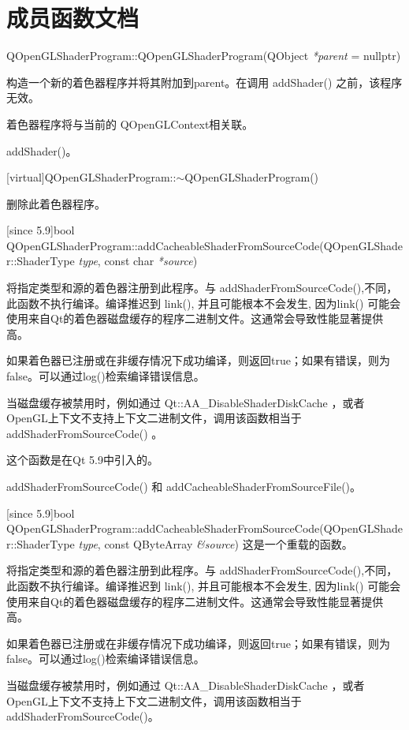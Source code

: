 \section{成员函数文档}

QOpenGLShaderProgram::QOpenGLShaderProgram(QObject \emph{*parent} = nullptr)

构造一个新的着色器程序并将其附加到parent。在调用 addShader() 之前，该程序无效。

着色器程序将与当前的 QOpenGLContext相关联。

\begin{seeAlso}
addShader()。
\end{seeAlso}

[virtual]QOpenGLShaderProgram::$\sim$QOpenGLShaderProgram()

删除此着色器程序。

[since 5.9]bool QOpenGLShaderProgram::addCacheableShaderFromSourceCode(QOpenGLShader::ShaderType \emph{type}, const char \emph{*source})

将指定类型和源的着色器注册到此程序。与 addShaderFromSourceCode(),不同，此函数不执行编译。编译推迟到 link(), 并且可能根本不会发生, 因为link() 可能会使用来自Qt的着色器磁盘缓存的程序二进制文件。这通常会导致性能显著提供高。

如果着色器已注册或在非缓存情况下成功编译，则返回true；如果有错误，则为false。可以通过log()检索编译错误信息。

当磁盘缓存被禁用时，例如通过 Qt::AA\_DisableShaderDiskCache ，或者OpenGL上下文不支持上下文二进制文件，调用该函数相当于addShaderFromSourceCode() 。

这个函数是在Qt 5.9中引入的。

\begin{seeAlso}
addShaderFromSourceCode() 和 addCacheableShaderFromSourceFile()。
\end{seeAlso}

[since 5.9]bool QOpenGLShaderProgram::addCacheableShaderFromSourceCode(QOpenGLShader::ShaderType \emph{type}, const QByteArray \emph{\&source})
这是一个重载的函数。

将指定类型和源的着色器注册到此程序。与 addShaderFromSourceCode(),不同，此函数不执行编译。编译推迟到 link(), 并且可能根本不会发生, 因为link() 可能会使用来自Qt的着色器磁盘缓存的程序二进制文件。这通常会导致性能显著提供高。

如果着色器已注册或在非缓存情况下成功编译，则返回true；如果有错误，则为false。可以通过log()检索编译错误信息。

当磁盘缓存被禁用时，例如通过 Qt::AA\_DisableShaderDiskCache ，或者OpenGL上下文不支持上下文二进制文件，调用该函数相当于addShaderFromSourceCode()。

